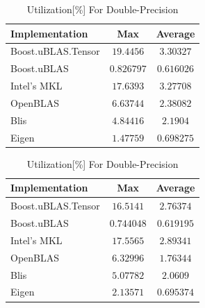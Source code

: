 \begin{table}[ht]
    \centering
    \caption{Utilization[\%] For Single-Precision}
    \begin{tabular}{|l|c|c|}
        \hline
        \textbf{Implementation} & \textbf{Max} & \textbf{Average}\\
        \hline
        Boost.uBLAS.Tensor  & $19.4456$& $3.30327$ \\
        \hline
        Boost.uBLAS         & $0.826797$& $0.616026$ \\
        \hline
        Intel's MKL         & $17.6393$& $3.27708$ \\
        \hline
        OpenBLAS            & $6.63744$& $2.38082$ \\
        \hline
        Blis                & $4.84416$& $2.1904$ \\
        \hline
        Eigen               & $1.47759$& $0.698275$ \\
        \hline
    \end{tabular}

    \vspace*{1 cm}

    \centering
    \caption{Utilization[\%] For Double-Precision}
    \begin{tabular}{|l|c|c|}
        \hline
        \textbf{Implementation} & \textbf{Max} & \textbf{Average}\\
        \hline
        Boost.uBLAS.Tensor  & $16.5141$& $2.76374$ \\
        \hline
        Boost.uBLAS         & $0.744048$& $0.619195$ \\
        \hline
        Intel's MKL         & $17.5565$& $2.89341$ \\
        \hline
        OpenBLAS            & $6.32996$& $1.76344$ \\
        \hline
        Blis                & $5.07782$& $2.0609$ \\
        \hline
        Eigen               & $2.13571$& $0.695374$ \\
        \hline
    \end{tabular}
\end{table}

